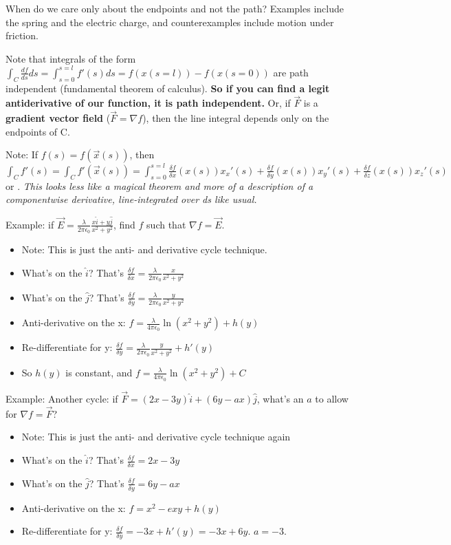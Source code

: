 \documentclass[11pt, oneside]{article}   	%
\begin{document}
When do we care only about the endpoints and not the path?  Examples include the spring and the electric charge, and counterexamples include motion under friction.

Note that integrals of the form $\int_C \frac{df}{ds}ds = \int_{s=0}^{s=l} f'(s)ds = f(x(s=l)) - f(x(s=0))$ are path independent (fundamental theorem of calculus).  \textbf{So if you can find a legit antiderivative of our function, it is path independent.}  Or, if $\vec{F}$ is a \textbf{gradient vector field} ($\vec{F} = \nabla f$), then the line integral depends only on the endpoints of C.

Note: If $f(s) = f(\vec{x}(s))$, then $\int_C f'(s) = \int_C f'(\vec{x}(s)) = \int_{s=0}^{s=l} \frac{\delta f}{\delta x} (x(s))x_x'(s) + \frac{\delta f}{\delta y} (x(s))x_y'(s) + \frac{\delta f}{\delta z} (x(s))x_z'(s)$ or .  \emph{This looks less like a magical theorem and more of a description of a componentwise derivative, line-integrated over ds like usual.}

Example: if $\vec{E} = \frac{\lambda}{2\pi\epsilon_0}\frac{x\hat{i} + y \hat{j}}{x^2 + y^2}$, find $f$ such that $\nabla f = \vec{E}$.
\begin{itemize}
\item Note: This is just the anti- and derivative cycle technique.
\item What's on the $\hat{i}$?  That's $\frac{\delta f}{\delta x} = \frac{\lambda}{2\pi\epsilon_0}\frac{x}{x^2 + y^2}$
\item What's on the $\hat{j}$? That's $\frac{\delta f}{\delta y} = \frac{\lambda}{2\pi\epsilon_0}\frac{y}{x^2 + y^2}$
\item Anti-derivative on the x: $f = \frac{\lambda}{4\pi\epsilon_0}\ln(x^2+y^2) + h(y)$
\item Re-differentiate for y: $\frac{\delta f}{\delta y}  = \frac{\lambda}{2\pi\epsilon_0}\frac{y}{x^2 + y^2} + h'(y)$
\item So $h(y)$ is constant, and $f = \frac{\lambda}{4\pi\epsilon_0}\ln(x^2+y^2) + C$
\end{itemize}

Example: Another cycle:  if $\vec{F} = (2x - 3y)\hat{i} + (6y - ax)\hat{j}$, what's an $a$ to allow for $\nabla f = \vec{F}$?
\begin{itemize}
\item Note: This is just the anti- and derivative cycle technique again
\item What's on the $\hat{i}$?  That's $\frac{\delta f}{\delta x} = 2x-3y$
\item What's on the $\hat{j}$? That's $\frac{\delta f}{\delta y} = 6y-ax$
\item Anti-derivative on the x: $f = x^2 - exy + h(y)$
\item Re-differentiate for y: $\frac{\delta f}{\delta y} = -3x + h'(y) = -3x + 6y$.  $a = -3$.
\end{itemize}
\end{document}
